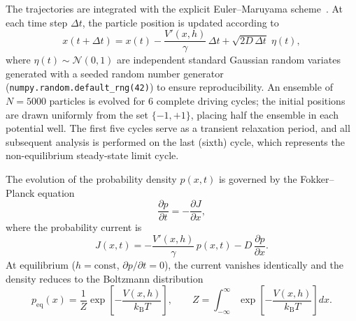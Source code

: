 The trajectories are integrated with the explicit Euler--Maruyama scheme~\cite{Kloeden1992}.
At each time step $\Delta t$, the particle position is updated according to
\begin{equation}
    x(t+\Delta t) = x(t) - \frac{V'(x,h)}{\gamma}\,\Delta t + \sqrt{2D\,\Delta t}\;\eta(t),
    \label{eq:euler_maruyama}
\end{equation}
where $\eta(t) \sim \mathcal{N}(0,1)$ are independent standard Gaussian random variates generated with a seeded random number generator (\texttt{numpy.random.default\_rng(42)}) to ensure reproducibility.
An ensemble of $N = \num{5000}$ particles is evolved for $\num{6}$ complete driving cycles; the initial positions are drawn uniformly from the set $\{-1, +1\}$, placing half the ensemble in each potential well.
The first five cycles serve as a transient relaxation period, and all subsequent analysis is performed on the last (sixth) cycle, which represents the non-equilibrium steady-state limit cycle.

The evolution of the probability density $p(x,t)$ is governed by the Fokker--Planck equation
\begin{equation}
    \frac{\partial p}{\partial t} = -\frac{\partial J}{\partial x},
    \label{eq:fokker_planck}
\end{equation}
where the probability current is
\begin{equation}
    J(x,t) = -\frac{V'(x,h)}{\gamma}\,p(x,t) - D\,\frac{\partial p}{\partial x}.
    \label{eq:probability_current}
\end{equation}
At equilibrium ($h = \text{const}$, $\partial p/\partial t = 0$), the current vanishes identically and the density reduces to the Boltzmann distribution
\begin{equation}
    p_{\mathrm{eq}}(x) = \frac{1}{Z}\exp\!\left[-\frac{V(x,h)}{k_{\mathrm{B}}T}\right],
    \qquad
    Z = \int_{-\infty}^{\infty}\exp\!\left[-\frac{V(x,h)}{k_{\mathrm{B}}T}\right]dx.
    \label{eq:boltzmann}
\end{equation}

